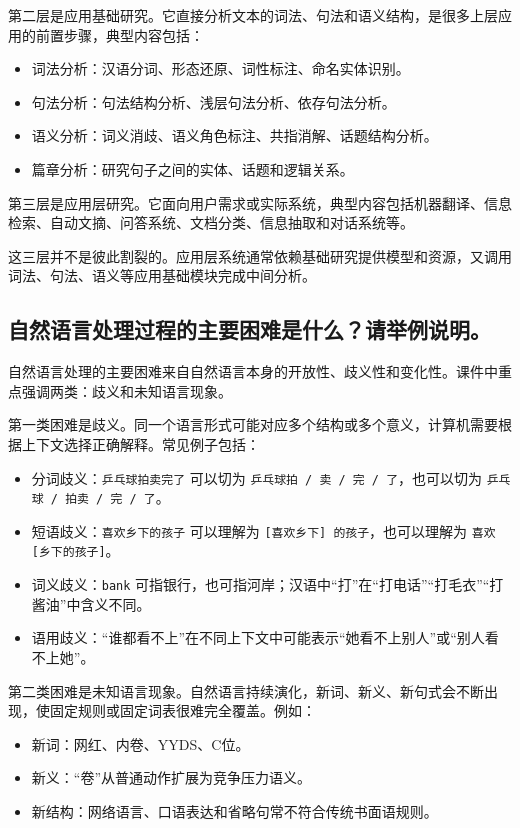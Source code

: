 第二层是应用基础研究。它直接分析文本的词法、句法和语义结构，是很多上层应用的前置步骤，典型内容包括：
\begin{itemize}
  \item 词法分析：汉语分词、形态还原、词性标注、命名实体识别。
  \item 句法分析：句法结构分析、浅层句法分析、依存句法分析。
  \item 语义分析：词义消歧、语义角色标注、共指消解、话题结构分析。
  \item 篇章分析：研究句子之间的实体、话题和逻辑关系。
\end{itemize}

第三层是应用层研究。它面向用户需求或实际系统，典型内容包括机器翻译、信息检索、自动文摘、问答系统、文档分类、信息抽取和对话系统等。

这三层并不是彼此割裂的。应用层系统通常依赖基础研究提供模型和资源，又调用词法、句法、语义等应用基础模块完成中间分析。

\subsection{自然语言处理过程的主要困难是什么？请举例说明。}

自然语言处理的主要困难来自自然语言本身的开放性、歧义性和变化性。课件中重点强调两类：歧义和未知语言现象。

第一类困难是歧义。同一个语言形式可能对应多个结构或多个意义，计算机需要根据上下文选择正确解释。常见例子包括：
\begin{itemize}
  \item 分词歧义：\texttt{乒乓球拍卖完了} 可以切为 \texttt{乒乓球拍 / 卖 / 完 / 了}，也可以切为 \texttt{乒乓球 / 拍卖 / 完 / 了}。
  \item 短语歧义：\texttt{喜欢乡下的孩子} 可以理解为 \texttt{[喜欢乡下] 的孩子}，也可以理解为 \texttt{喜欢 [乡下的孩子]}。
  \item 词义歧义：\texttt{bank} 可指银行，也可指河岸；汉语中“打”在“打电话”“打毛衣”“打酱油”中含义不同。
  \item 语用歧义：“谁都看不上”在不同上下文中可能表示“她看不上别人”或“别人看不上她”。
\end{itemize}

第二类困难是未知语言现象。自然语言持续演化，新词、新义、新句式会不断出现，使固定规则或固定词表很难完全覆盖。例如：
\begin{itemize}
  \item 新词：网红、内卷、YYDS、C位。
  \item 新义：“卷”从普通动作扩展为竞争压力语义。
  \item 新结构：网络语言、口语表达和省略句常不符合传统书面语规则。
\end{itemize}

